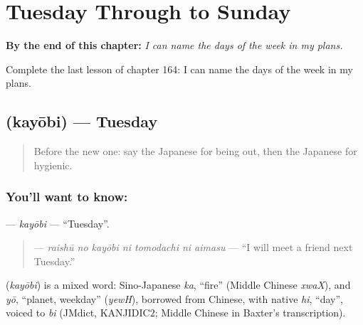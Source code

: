 
\chapter{Tuesday Through to Sunday}
\label{ch:ja-tuesday-through-to-sunday}

\begin{chapteropening}
\textbf{By the end of this chapter:} \emph{I can name the days of the week in my plans.}

Complete the last lesson of chapter 164: I can name the days of the week in my plans.
\end{chapteropening}

\section[\texorpdfstring{\ja{かようび} (kayōbi)}{かようび (kayōbi)}]{ (kayōbi) — Tuesday}

\label{lesson:JA-C164-kayoubi}



\begin{quote}
Before the new one: say the Japanese for being out, then the Japanese for hygienic.
\end{quote}

\subsection*{You'll want to know: }
\textbf{} — \emph{kayōbi} — \textquotedblleft{}Tuesday\textquotedblright{}.

\begin{quote}
\textbf{   } — \emph{raishū no kayōbi ni tomodachi ni aimasu} — \textquotedblleft{}I will meet a friend next Tuesday.\textquotedblright{}
\end{quote}

\begin{cousinweb}
\textbf{} (\emph{kayōbi}) is a mixed word: Sino-Japanese \emph{ka}, \textquotedblleft{}fire\textquotedblright{} (Middle Chinese \emph{xwaX}), and \emph{yō}, \textquotedblleft{}planet, weekday\textquotedblright{} (\emph{yewH}), borrowed from Chinese, with native \emph{hi}, \textquotedblleft{}day\textquotedblright{}, voiced to \emph{bi} (JMdict, KANJIDIC2; Middle Chinese in Baxter's transcription).
\end{cousinweb}

